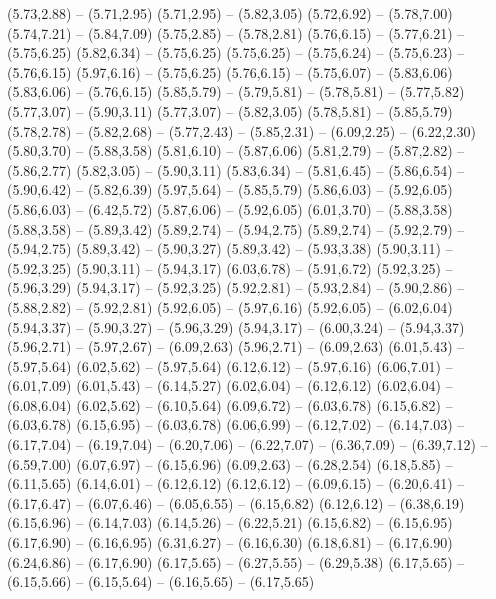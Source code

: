 {  (5.73,2.88) -- (5.71,2.95)
  (5.71,2.95) -- (5.82,3.05)
  (5.72,6.92) -- (5.78,7.00)
  (5.74,7.21) -- (5.84,7.09)
  (5.75,2.85) -- (5.78,2.81)
  (5.76,6.15) -- (5.77,6.21) -- (5.75,6.25)
  (5.82,6.34) -- (5.75,6.25)
  (5.75,6.25) -- (5.75,6.24) -- (5.75,6.23) -- (5.76,6.15)
  (5.97,6.16) -- (5.75,6.25)
  (5.76,6.15) -- (5.75,6.07) -- (5.83,6.06)
  (5.83,6.06) -- (5.76,6.15)
  (5.85,5.79) -- (5.79,5.81) -- (5.78,5.81) -- (5.77,5.82)
  (5.77,3.07) -- (5.90,3.11)
  (5.77,3.07) -- (5.82,3.05)
  (5.78,5.81) -- (5.85,5.79)
  (5.78,2.78) -- (5.82,2.68) -- (5.77,2.43) -- (5.85,2.31) -- (6.09,2.25) -- (6.22,2.30)
  (5.80,3.70) -- (5.88,3.58)
  (5.81,6.10) -- (5.87,6.06)
  (5.81,2.79) -- (5.87,2.82) -- (5.86,2.77)
  (5.82,3.05) -- (5.90,3.11)
  (5.83,6.34) -- (5.81,6.45) -- (5.86,6.54) -- (5.90,6.42) -- (5.82,6.39)
  (5.97,5.64) -- (5.85,5.79)
  (5.86,6.03) -- (5.92,6.05)
  (5.86,6.03) -- (6.42,5.72)
  (5.87,6.06) -- (5.92,6.05)
  (6.01,3.70) -- (5.88,3.58)
  (5.88,3.58) -- (5.89,3.42)
  (5.89,2.74) -- (5.94,2.75)
  (5.89,2.74) -- (5.92,2.79) -- (5.94,2.75)
  (5.89,3.42) -- (5.90,3.27)
  (5.89,3.42) -- (5.93,3.38)
  (5.90,3.11) -- (5.92,3.25)
  (5.90,3.11) -- (5.94,3.17)
  (6.03,6.78) -- (5.91,6.72)
  (5.92,3.25) -- (5.96,3.29)
  (5.94,3.17) -- (5.92,3.25)
  (5.92,2.81) -- (5.93,2.84) -- (5.90,2.86) -- (5.88,2.82) -- (5.92,2.81)
  (5.92,6.05) -- (5.97,6.16)
  (5.92,6.05) -- (6.02,6.04)
  (5.94,3.37) -- (5.90,3.27) -- (5.96,3.29)
  (5.94,3.17) -- (6.00,3.24) -- (5.94,3.37)
  (5.96,2.71) -- (5.97,2.67) -- (6.09,2.63)
  (5.96,2.71) -- (6.09,2.63)
  (6.01,5.43) -- (5.97,5.64)
  (6.02,5.62) -- (5.97,5.64)
  (6.12,6.12) -- (5.97,6.16)
  (6.06,7.01) -- (6.01,7.09)
  (6.01,5.43) -- (6.14,5.27)
  (6.02,6.04) -- (6.12,6.12)
  (6.02,6.04) -- (6.08,6.04)
  (6.02,5.62) -- (6.10,5.64)
  (6.09,6.72) -- (6.03,6.78)
  (6.15,6.82) -- (6.03,6.78)
  (6.15,6.95) -- (6.03,6.78)
  (6.06,6.99) -- (6.12,7.02) -- (6.14,7.03) -- (6.17,7.04) -- (6.19,7.04) -- (6.20,7.06) -- (6.22,7.07) -- (6.36,7.09) -- (6.39,7.12) -- (6.59,7.00)
  (6.07,6.97) -- (6.15,6.96)
  (6.09,2.63) -- (6.28,2.54)
  (6.18,5.85) -- (6.11,5.65)
  (6.14,6.01) -- (6.12,6.12)
  (6.12,6.12) -- (6.09,6.15) -- (6.20,6.41) -- (6.17,6.47) -- (6.07,6.46) -- (6.05,6.55) -- (6.15,6.82)
  (6.12,6.12) -- (6.38,6.19)
  (6.15,6.96) -- (6.14,7.03)
  (6.14,5.26) -- (6.22,5.21)
  (6.15,6.82) -- (6.15,6.95)
  (6.17,6.90) -- (6.16,6.95)
  (6.31,6.27) -- (6.16,6.30)
  (6.18,6.81) -- (6.17,6.90)
  (6.24,6.86) -- (6.17,6.90)
  (6.17,5.65) -- (6.27,5.55) -- (6.29,5.38)
  (6.17,5.65) -- (6.15,5.66) -- (6.15,5.64) -- (6.16,5.65) -- (6.17,5.65)
}
